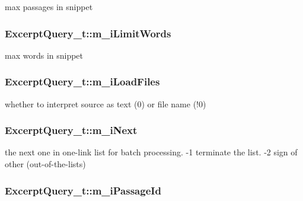 max passages in snippet 

\hypertarget{structExcerptQuery__t_a55c04b93bc46a5471cce09bc8b8144ae}{
\subsubsection[{m\-\_\-i\-Limit\-Words}]{ Excerpt\-Query\-\_\-t\-::m\-\_\-i\-Limit\-Words}}\label{structExcerptQuery__t_a55c04b93bc46a5471cce09bc8b8144ae}


max words in snippet 

\hypertarget{structExcerptQuery__t_a4f777950b5faa471f8a6678e42349d8f}{
\subsubsection[{m\-\_\-i\-Load\-Files}]{ Excerpt\-Query\-\_\-t\-::m\-\_\-i\-Load\-Files}}\label{structExcerptQuery__t_a4f777950b5faa471f8a6678e42349d8f}


whether to interpret source as text (0) or file name (!0) 

\hypertarget{structExcerptQuery__t_af9d1c73cdff1f0164ec60aca96b66e33}{
\subsubsection[{m\-\_\-i\-Next}]{ Excerpt\-Query\-\_\-t\-::m\-\_\-i\-Next}}\label{structExcerptQuery__t_af9d1c73cdff1f0164ec60aca96b66e33}


the next one in one-\/link list for batch processing. -\/1 terminate the list. -\/2 sign of other (out-\/of-\/the-\/lists) 

\hypertarget{structExcerptQuery__t_a540b5cd5733b6116381572859dcc3945}{
\subsubsection[{m\-\_\-i\-Passage\-Id}]{ Excerpt\-Query\-\_\-t\-::m\-\_\-i\-Passage\-Id}}\label{structExcerptQuery__t_a540b5cd5733b6116381572859dcc3945}


